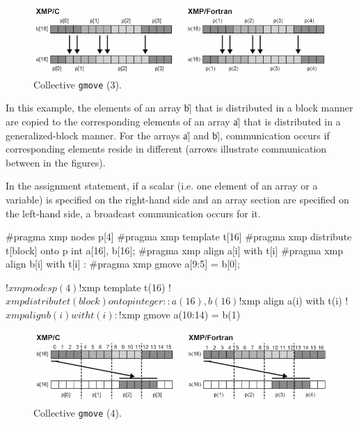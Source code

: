 \begin{figure}
  \centering
  \includegraphics[width=\textwidth]{figs/gmove_change.png}
  \caption{Collective {\tt gmove} (3).}
\end{figure}

In this example, the elements of an array \|b| that is distributed in
a block manner are copied to the corresponding elements of an array \|a|
that is distributed in a generalized-block manner.
%
For the arrays \|a| and \|b|, communication occurs if corresponding elements
reside in different {\nodes} (arrows illustrate communication between {\nodes} in
the figures).


In the assignment statement, if a scalar (i.e. one element of an array or
a variable) is specified on the right-hand side and an array section are
specified on the left-hand side, a broadcast communication occurs for it.

\begin{XCexample}
#pragma xmp nodes p[4]
#pragma xmp template t[16]
#pragma xmp distribute t[block] onto p
int a[16], b[16];
#pragma xmp align a[i] with t[i]
#pragma xmp align b[i] with t[i]
     :
#pragma xmp gmove
  a[9:5] = b[0];
\end{XCexample}

\begin{XFexample}
!$xmp nodes p(4)
!$xmp template t(16)
!$xmp distribute t(block) onto p
integer :: a(16), b(16)
!$xmp align a(i) with t(i)
!$xmp align b(i) with t(i)
     :
!$xmp gmove
  a(10:14) = b(1)
\end{XFexample}

\begin{figure}
  \centering
  \includegraphics[width=\textwidth]{figs/gmove_one_element.png}
  \caption{Collective {\tt gmove} (4).}
\end{figure}

